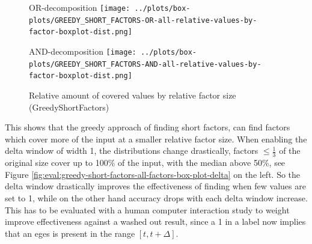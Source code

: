 \begin{figure}[t]
	\begin{minipage}[h]{0.49\linewidth}
		\centering
		OR-decomposition
		\texttt{[image: ../plots/box-plots/GREEDY\_SHORT\_FACTORS-OR-all-relative-values-by-factor-boxplot-dist.png]}
	\end{minipage}
	\begin{minipage}[h]{0.49\linewidth}
		\centering
		AND-decomposition
		\texttt{[image: ../plots/box-plots/GREEDY\_SHORT\_FACTORS-AND-all-relative-values-by-factor-boxplot-dist.png]}
	\end{minipage}
	\caption{Relative amount of covered values by relative factor size (GreedyShortFactors)}
	\label{fig:eval:greedy-short-factors-all-factors-box-plot}
\end{figure}
This shows that the greedy approach of finding short factors, can find factors which cover more of the input at a smaller relative factor size.
When enabling the delta window of width 1, the distributions change drastically, factors $\leq \frac{1}{3}$ of the original size cover up to 100\% of the input, with the median above 50\%, see Figure \ref{fig:eval:greedy-short-factors-all-factors-box-plot-delta} on the left.
So the delta window drastically improves the effectiveness of finding \orDecomp when few values are set to 1, while on the other hand accuracy drops with each delta window increase.
This has to be evaluated with a human computer interaction study to weight improve effectiveness against a washed out result, since a 1 in a label now implies that an eges is present in the range  $[t, t + \Delta]$.
